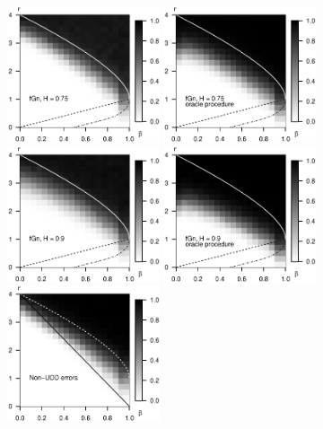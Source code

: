 \begin{figure}
    \centering
    \includegraphics[width=0.4\textwidth]{./figures/simulated_boundaries/simulated_phase_diagram_fGn075_p10000.eps}
    \includegraphics[width=0.4\textwidth]{./figures/simulated_boundaries/simulated_phase_diagram_fGn075_p10000_oracle.eps}
    \includegraphics[width=0.4\textwidth]{./figures/simulated_boundaries/simulated_phase_diagram_fGn09_p10000.eps}
    \includegraphics[width=0.4\textwidth]{./figures/simulated_boundaries/simulated_phase_diagram_fGn09_p10000_oracle.eps}
    \includegraphics[width=0.4\textwidth]{./figures/simulated_boundaries/simulated_phase_diagram_block_structure_p10000_agnostic7.eps}

\end{figure}
